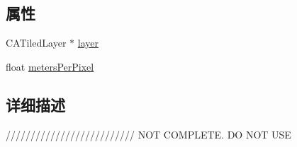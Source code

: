 \subsection*{属性}
\begin{DoxyCompactItemize}
\item 
C\-A\-Tiled\-Layer $\ast$ \hyperlink{interface_r_m_tiled_layer_controller_a5e64cfd971c8c2a1da7edc3b3849e5c8}{layer}
\item 
float \hyperlink{interface_r_m_tiled_layer_controller_ae80e5444b62b79a5a92af429f015d1ea}{meters\-Per\-Pixel}
\end{DoxyCompactItemize}


\subsection{详细描述}
////////////////////////// N\-O\-T C\-O\-M\-P\-L\-E\-T\-E. D\-O N\-O\-T U\-S\-E 

